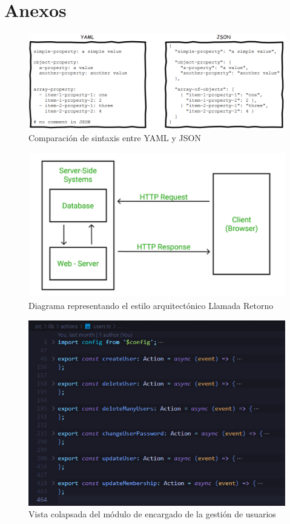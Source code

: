 \section{Anexos}
\begin{figure}[h]
    \centering
    \includegraphics[width=\linewidth]{images/yaml-vs-json.png}
    \caption{Comparación de sintaxis entre YAML y JSON}
    \label{fig:yaml-vs-json}
\end{figure}

\begin{figure}[h]
    \centering
    \includegraphics[width=\linewidth]{images/call-return-style.png}
    \caption{Diagrama representando el estilo arquitectónico Llamada Retorno}
    \label{fig:call-return-style}
\end{figure}

\begin{figure}[h]
    \centering
    \includegraphics[scale=0.8]{images/code/collapsed-view-of-user-module.png}
    \caption{Vista colapsada del módulo de encargado de la gestión de usuarios}
    \label{fig:collapsed-view-of-user-module}
\end{figure}

